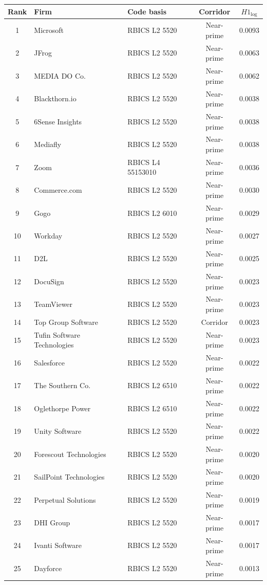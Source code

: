 \begin{tabularx}{\textwidth}{@{}c
  >{\hsize\raggedright\arraybackslash}X
  >{\hsize\raggedright\arraybackslash}X
  c
  S[table-format=1.4]@{}}
\toprule
Rank & Firm & Code basis & Corridor & {$H1_{\log}$} \\
 & Microsoft & RBICS L2 5520 & Near-prime & 0.0093 \\
2 & JFrog & RBICS L2 5520 & Near-prime & 0.0063 \\
3 & MEDIA DO Co. & RBICS L2 5520 & Near-prime & 0.0062 \\
4 & Blackthorn.io & RBICS L2 5520 & Near-prime & 0.0038 \\
5 & 6Sense Insights & RBICS L2 5520 & Near-prime & 0.0038 \\
6 & Mediafly & RBICS L2 5520 & Near-prime & 0.0038 \\
7 & Zoom & RBICS L4 55153010 & Near-prime & 0.0036 \\
8 & Commerce.com & RBICS L2 5520 & Near-prime & 0.0030 \\
9 & Gogo & RBICS L2 6010 & Near-prime & 0.0029 \\
10 & Workday & RBICS L2 5520 & Near-prime & 0.0027 \\
11 & D2L & RBICS L2 5520 & Near-prime & 0.0025 \\
12 & DocuSign & RBICS L2 5520 & Near-prime & 0.0023 \\
13 & TeamViewer & RBICS L2 5520 & Near-prime & 0.0023 \\
14 & Top Group Software & RBICS L2 5520 & Corridor & 0.0023 \\
15 & Tufin Software Technologies & RBICS L2 5520 & Near-prime & 0.0023 \\
16 & Salesforce & RBICS L2 5520 & Near-prime & 0.0022 \\
17 & The Southern Co. & RBICS L2 6510 & Near-prime & 0.0022 \\
18 & Oglethorpe Power & RBICS L2 6510 & Near-prime & 0.0022 \\
19 & Unity Software & RBICS L2 5520 & Near-prime & 0.0022 \\
20 & Forescout Technologies & RBICS L2 5520 & Near-prime & 0.0020 \\
21 & SailPoint Technologies & RBICS L2 5520 & Near-prime & 0.0020 \\
22 & Perpetual Solutions & RBICS L2 5520 & Near-prime & 0.0019 \\
23 & DHI Group & RBICS L2 5520 & Near-prime & 0.0017 \\
24 & Ivanti Software & RBICS L2 5520 & Near-prime & 0.0017 \\
25 & Dayforce & RBICS L2 5520 & Near-prime & 0.0013 \\
\bottomrule
\end{tabularx}